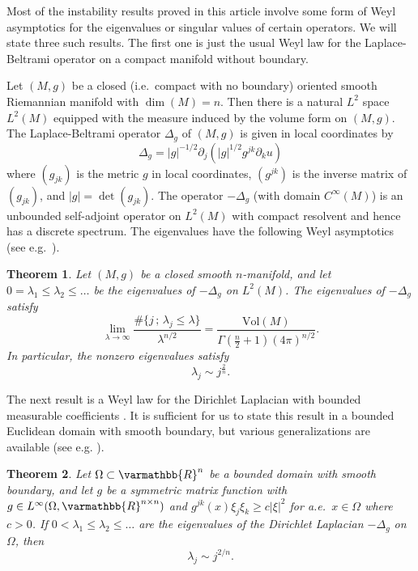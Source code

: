 \documentclass[12pt,twoside]{amsart}
\numberwithin{equation}{section}
\renewcommand{\leq}{\leqslant}
\renewcommand{\geq}{\geqslant}
\renewcommand{\mathbb}{\varmathbb}
\newtheorem{theorem}{Theorem}[section]
\newcommand {\p} {\partial}
\newcommand{\mR}{\mathbb{R}}                    %
\newcommand{\abs}[1]{\lvert #1 \rvert}          %
\begin{document}
Most of the instability results proved in this article involve some form of Weyl asymptotics for the eigenvalues or singular values of certain operators. We will state three such results. The first one is just the usual Weyl law for the Laplace-Beltrami operator on a compact manifold without boundary.

Let $(M,g)$ be a closed (i.e.\ compact with no boundary) oriented smooth Riemannian manifold with $\dim(M) = n$. Then there is a natural $L^2$ space $L^2(M)$ equipped with the measure induced by the volume form on $(M,g)$. The Laplace-Beltrami operator $\Delta_g$ of $(M,g)$ is given in local coordinates by 
\[
\Delta_g = \abs{g}^{-1/2} \p_j( \abs{g}^{1/2} g^{jk} \p_k u)
\]
where $(g_{jk})$ is the metric $g$ in local coordinates, $(g^{jk})$ is the inverse matrix of $(g_{jk})$, and $\abs{g} = \det(g_{jk})$. The operator $-\Delta_g$ (with domain $C^{\infty}(M)$) is an unbounded self-adjoint operator on $L^2(M)$ with compact resolvent and hence has a discrete spectrum. The eigenvalues have the following Weyl asymptotics (see e.g.\ \cite[Section 8.3 in vol. II]{Taylor}).

\begin{theorem} \label{thm_weyl1}
Let $(M,g)$ be a closed smooth $n$-manifold, and let $0 = \lambda_1 \leq \lambda_2 \leq \ldots$ be the eigenvalues of $-\Delta_g$ on $L^2(M)$. The eigenvalues of $-\Delta_g$ satisfy 
\[
\lim_{\lambda \to \infty} \frac{\#\{ j \,;\, \lambda_j \leq \lambda \}}{\lambda^{n/2}} = \frac{\mathrm{Vol}(M)}{\Gamma(\frac{n}{2}+1) (4\pi)^{n/2}}.
\]
In particular, the nonzero eigenvalues satisfy 
\[
\lambda_j \sim j^{\frac{2}{n}}.
\]
\end{theorem}

The next result is a Weyl law for the Dirichlet Laplacian with bounded measurable coefficients \cite{BirmanSolomyak_nonsmooth}. It is sufficient for us to state this result in a bounded Euclidean domain with smooth boundary, but various generalizations are available (see e.g. \cite{BNR}).

\begin{theorem} \label{thm_weyl2}
Let $\Omega \subset \mR^n$ be a bounded domain with smooth boundary, and let $g$ be a symmetric matrix function with $g \in L^{\infty}(\Omega, \mR^{n \times n})$ and $g^{jk}(x) \xi_j \xi_k \geq c \abs{\xi}^2$ for a.e.\ $x \in \Omega$ where $c > 0$. If $0 < \lambda_1 \leq \lambda_2 \leq \ldots$ are the eigenvalues of the Dirichlet Laplacian $-\Delta_g$ on $\Omega$, then 
\[
\lambda_j \sim j^{2/n}.
\]
\end{theorem}
\end{document}

